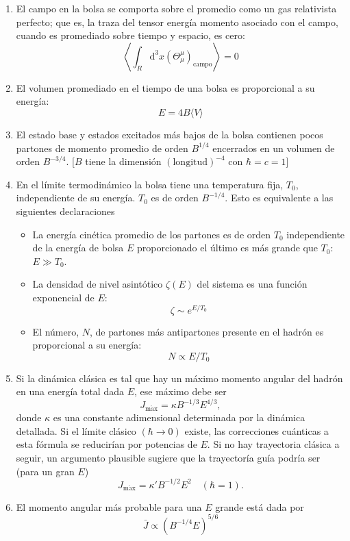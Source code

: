 \begin{enumerate}

\item El campo en la bolsa se comporta sobre el promedio como un gas relativista perfecto; que es, la traza del tensor energía momento asociado con el campo, cuando es promediado sobre tiempo y espacio, es cero:
\begin{equation}
\left\langle \int_{R} {\mathrm{d}}^{3} x ({\Theta}_{\mu}^{\mu})_{\mathrm{campo}} \right\rangle = 0
\end{equation}
\item El volumen promediado en el tiempo de una bolsa es proporcional a su energía:
\begin{equation}
E = 4B \langle V \rangle
\end{equation}
\item El estado base y estados excitados más bajos de la bolsa contienen pocos partones de momento promedio de orden ${B}^{1/4}$ encerrados en un volumen de orden ${B}^{-3/4}$. [$B$ tiene la dimensión $(\mathrm{longitud})^{-4}$ con $\hbar=c=1$]
\item En el límite termodinámico la bolsa tiene una temperatura fija, ${T}_{0}$, independiente de su energía. ${T}_{0}$ es de orden ${B}^{-1/4}$. Esto es equivalente a las siguientes declaraciones
\begin{itemize}
\item La energía cinética promedio de los partones es de orden ${T}_{0}$ independiente de la energía de bolsa $E$ proporcionado el último es más grande que ${T}_{0}$: ${E} \gg {T}_{0}$.
\item La densidad de nivel asintótico ${\zeta(E)}$ del sistema es una función exponencial de $E$:
\[
\zeta \sim {e}^{E/{T}_{0}}
\]
\item El número, $N$, de partones más antipartones presente en el hadrón es proporcional a su energía:
\[
N \propto E/{T}_{0}
\]
\end{itemize}
\item Si la dinámica clásica es tal que hay un máximo momento angular del hadrón en una energía total dada $E$, ese máximo debe ser 
\[
{J}_{\mathrm{m\acute{a}x}} = \kappa {B}^{-1/3} {E}^{4 / 3},
\]
donde ${\kappa}$ es una constante adimensional determinada por la dinámica detallada. Si el límite clásico $({\hbar} \rightarrow 0)$ existe, las correcciones cuánticas a esta fórmula se reducirían por potencias de $E$. Si no hay trayectoria clásica a seguir, un argumento plausible sugiere que la trayectoría guía podría ser (para un gran $E$)
\[
{J}_{\mathrm{m\acute{a}x}} = {\kappa}' {B}^{-1/2} {E}^{2} \quad ({\hbar = 1}).
\]
\item El momento angular más probable para una $E$ grande está dada por 
\[
\bar{J} \propto ({B}^{-1/4} E)^{5/6}
\]
\end{enumerate}

